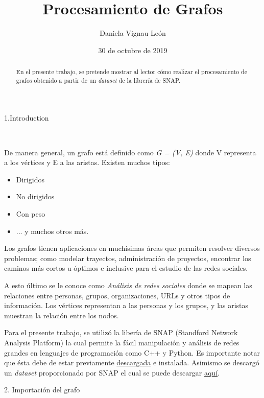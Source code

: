 \documentclass[12pt, letterpaper, twocolumn]{article}
\title{Procesamiento de Grafos}
\author{Daniela Vignau León}
\date{30 de octubre de 2019}
\begin{document}
\maketitle
 
\begin{abstract}
En el presente trabajo, se pretende mostrar al lector cómo realizar el procesamiento de grafos obtenido a partir de un \textit{dataset} de la librería de SNAP.
\end{abstract}

\begin{description}
\item [{1.Introduction}]~
\end{description}

De manera general, un grafo está definido como \textit{G = (V, E)} donde V representa a los vértices y E a las aristas. Existen muchos tipos:
\begin{itemize}
	\item Dirigidos
	\item No dirigidos
	\item Con peso
	\item ... y muchos otros más.
\end{itemize}

Los grafos tienen aplicaciones en muchísimas áreas que permiten resolver diversos problemas; como modelar trayectos, administración de proyectos, encontrar los caminos más cortos u óptimos e inclusive para el estudio de las redes sociales. 

A esto último se le conoce como \textit{Análisis de redes sociales} donde se mapean las relaciones entre personas, grupos, organizaciones, URLs y otros tipos de información. Los vértices representan a las personas y los grupos, y las aristas muestran la relación entre los nodos. 

Para el presente trabajo, se utilizó la libería de SNAP (Standford Network Analysis Platform) la cual permite la fácil manipulación y análisis de redes grandes en lenguajes de programación como C++ y Python. Es importante notar que ésta debe de estar previamente \href{https://snap.stanford.edu/snap/install.html}{descargada} e instalada. Asimismo se descargó un \textit{dataset} proporcionado por SNAP el cual se puede descargar \href{https://snap.stanford.edu/data/index.html}{aquí}.

\begin{description}
\item [{2. Importación del grafo}]~
\end{description}
\end{document}
